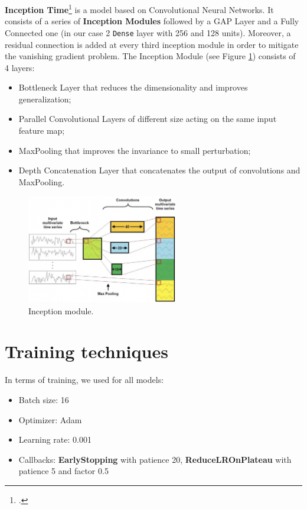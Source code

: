 \documentclass[conference,compsoc,11pt]{IEEEtran}
\begin{document}
\textbf{Inception Time}\footcite{Del2020Time} is a model based on Convolutional Neural Networks. It consists of a series of \textbf{Inception Modules} followed by a GAP Layer and a Fully Connected one (in our case 2 \texttt{Dense} layer with 256 and 128 units). Moreover, a residual connection is added at every third inception module in order to mitigate the vanishing gradient problem. The Inception Module (see Figure \ref{fig:inception-module}) consists of 4 layers:
\begin{itemize}
    \item Bottleneck Layer that reduces the dimensionality and improves generalization;
    \item Parallel Convolutional Layers of different size acting on the same input feature map;
    \item MaxPooling that improves the invariance to small perturbation;
    \item Depth Concatenation Layer that concatenates the output of convolutions and MaxPooling.
\end{itemize}

\begin{figure}[h!]
\centering
\includegraphics[width=2.6in]{inception_module.png}
\caption{Inception module.}
\label{fig:inception-module}
\end{figure}

\section{Training techniques}

In terms of training, we used for all models:
\begin{itemize}
    \item Batch size: 16
    \item Optimizer: Adam
    \item Learning rate: 0.001
    \item Callbacks: \textbf{EarlyStopping} with patience 20, \textbf{ReduceLROnPlateau} with patience 5 and factor 0.5
\end{itemize}
\end{document}

